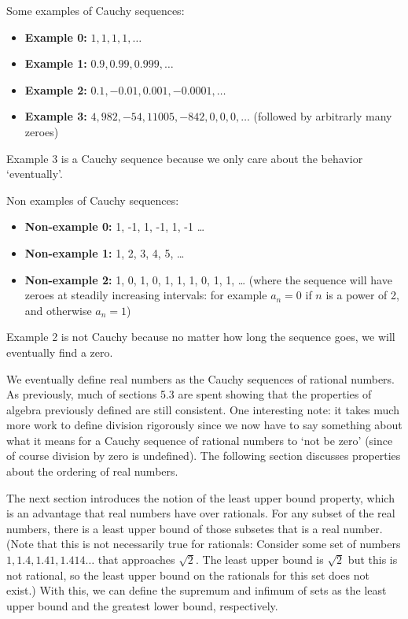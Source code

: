 \documentclass[answers,12pt]{exam}
\begin{document}
Some examples of Cauchy sequences:

\begin{itemize}
    \item \textbf{Example 0:}
    $1, 1, 1, 1, \dots$
    \item \textbf{Example 1:}
    $0.9, 0.99, 0.999, \dots$
    \item \textbf{Example 2:}
    $0.1, -0.01, 0.001, -0.0001, \dots$
    \item \textbf{Example 3:}
    $4, 982, -54, 11005, -842, 0, 0, 0, \dots$
    (followed by arbitrarly many zeroes)
\end{itemize}
Example 3 is a Cauchy sequence because we only care about the behavior `eventually'.

Non examples of Cauchy sequences:
\begin{itemize}
    \item \textbf{Non-example 0:}
    1, -1,  1, -1, 1, -1 \dots
    \item \textbf{Non-example 1:}
    1, 2, 3, 4, 5, \dots
    \item \textbf{Non-example 2:}
    1, 0, 1, 0, 1, 1, 1, 0, 1, 1, \dots
    (where the sequence will have zeroes at steadily increasing intervals: for example $a_n = 0$ if $n$ is a power of 2, and otherwise $a_n=1$)
\end{itemize}
Example 2 is not Cauchy because no matter how long the sequence goes, we will eventually find a zero.

We eventually define real numbers as the Cauchy sequences of rational numbers.
As previously, much of sections 5.3 are spent showing that the properties of algebra previously defined are still consistent.
One interesting note: it takes much more work to define division rigorously since we now have to say something about what it means for a Cauchy sequence of rational numbers to `not be zero' (since of course division by zero is undefined).
The following section discusses properties about the ordering of real numbers.

The next section introduces the notion of the least upper bound property, which is an advantage that real numbers have over rationals.
For any subset of the real numbers, there is a least upper bound of those subsetes that is a real number. 
(Note that this is not necessarily true for rationals:
Consider some set of numbers $1, 1.4, 1.41, 1.414 \dots$ that approaches $\sqrt{2}$.
The least upper bound is $\sqrt{2}$ but this is not rational, so the least upper bound on the rationals for this set does not exist.)
With this, we can define the supremum and infimum of sets as the least upper bound and the greatest lower bound, respectively.
\end{document}
